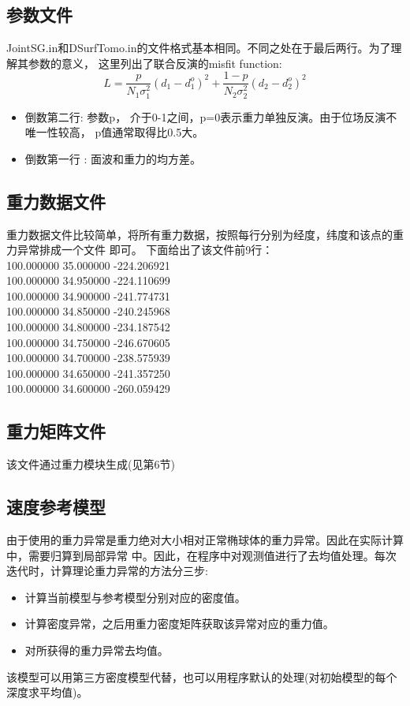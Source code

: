 \documentclass[10p,UTF8]{ctexart}
\begin{document}
    \subsection{参数文件}
    JointSG.in和DSurfTomo.in的文件格式基本相同。不同之处在于最后两行。为了理解其参数的意义，
    这里列出了联合反演的misfit function:
    \[
        L = \frac{p}{N_1 \sigma_1^2} (d_1- d_1^o)^2 + 
            \frac{1-p}{N_2 \sigma_2^2} (d_2- d_2^o)^2 \tag{1}
    \]
    \begin{itemize}
        \item 倒数第二行: 参数p， 介于0-1之间，p=0表示重力单独反演。由于位场反演不唯一性较高，
                        p值通常取得比0.5大。
        \item 倒数第一行 : 面波和重力的均方差。
    \end{itemize}

    \subsection{重力数据文件}
    重力数据文件比较简单，将所有重力数据，按照每行分别为经度，纬度和该点的重力异常排成一个文件
    即可。
    下面给出了该文件前9行：\\
    100.000000 35.000000 -224.206921\\
    100.000000 34.950000 -224.110699\\
    100.000000 34.900000 -241.774731\\
    100.000000 34.850000 -240.245968\\
    100.000000 34.800000 -234.187542\\
    100.000000 34.750000 -246.670605\\
    100.000000 34.700000 -238.575939\\
    100.000000 34.650000 -241.357250\\
    100.000000 34.600000 -260.059429\\

    \subsection{重力矩阵文件}
    该文件通过重力模块生成(见第6节)

    \subsection{速度参考模型}
    由于使用的重力异常是重力绝对大小相对正常椭球体的重力异常。因此在实际计算中，需要归算到局部异常
    中。因此，在程序中对观测值进行了去均值处理。每次迭代时，计算理论重力异常的方法分三步:
    \begin{itemize}
        \item 计算当前模型与参考模型分别对应的密度值。
        \item 计算密度异常，之后用重力密度矩阵获取该异常对应的重力值。
        \item 对所获得的重力异常去均值。
    \end{itemize}
    该模型可以用第三方密度模型代替，也可以用程序默认的处理(对初始模型的每个深度求平均值)。
\end{document}
